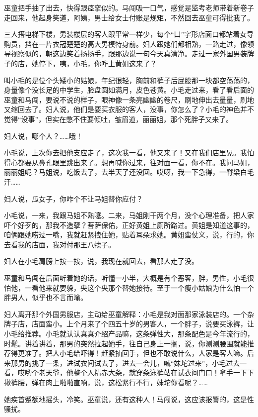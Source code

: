 \documentclass[lang=cn,newtx,12pt,scheme=chinese]{elegantbook}
\begin{document}
巫童把手抽了出去，快得跟痉挛似的。马闯吸一口气，感觉是监考老师带着新卷子走回来，他起身笑道，阿姨，男士给女士付账是规矩，不然回去巫童可得批我了。

三人搭电梯下楼，男装楼层的客人跟平常一样少，每个“凵”字形店面口都站着女导购员，挡在一片衣冠楚楚的高大男模特身前。妇人跟她们都相熟，一路走过，像领导视察似的，朝这边笑着扬扬手，跟那边说一句今天真清净。走过一家外国男装牌子的店，她停下，咦，小毛，你咋上黄姐这来了？

叫小毛的是位个头矮小的姑娘，年纪很轻，胸前和裤子后屁股那一块都空荡荡的，身量像个没长足的中学生，脸盘圆如满月，皮色苍黄。小毛走过来，看了看后面的巫童和马闯，要说不说的样子，眼神像一条亮幽幽的卷尺，刷地伸出去量量，刷地又缩回去了。妇人说，他们是要买衣服的客人，没事，你怎么了？小毛的神色并不觉得“没事”，但实在憋不住要倾吐，皱眉道，丽丽姐，那个死胖子又来了。

妇人说，哪个人？……哦！

小毛说，上次你去把他支应走了，这次我一看，他又来了！又在我们店里晃。我怕得心都要从鼻孔眼里跳出来了。想再喊你过来，往对面一看，你不在。我问马姐，丽丽姐呢？马姐说，吃饭去了，去半天了还没回。哎呀，我一下急得，一脊梁白毛汗……

妇人说，瓜女子，你咋个不让马姐替你应付？

小毛说，一来，我跟马姐不熟噻。二来，马姐刚干两个月，没个心理准备，把人家吓个好歹的，那我不造孽？菩萨保佑，正好黄姐上厕所路过。黄姐是知道这事的，咱俩跟她唠过一嘴，我就赶紧拽住她，贴着耳朵求她。黄姐蛮仗义，说，行的，你去看我的店面，我对付那王八犊子。

妇人在小毛肩膀上按一按，说，我现在就回去，看那人走了没。

巫童和马闯在后面听着她的话，听懂一小半，大概是有个恶客，胖，男性，小毛很怕他，一看他来就要躲，央这个央那个替她接待。至于一个瘦小姑娘为什么怕一个胖男人，似乎也不言而喻。

妇人离开那个外国男服店，主动给巫童解释：小毛是我对面那家泳装店的。一个杂牌子店，店面蛮小。上个月来了个四五十岁的男客人，一个胖子，说要买泳裤，让小毛给推荐。小毛就认认真真介绍产品嘛，这条弹性大，那条配色是今年流行的，时髦。讲着讲着，那男的突然拉起她手，往自己身上一搁，说，你测测腰围就能推荐得更准了。把人小毛给吓得！赶紧抽回手，但也不敢说什么，人家是客人嘛。后来那男的挑了一条，进试衣间试去了，进去一会儿，喊“妹坨过来”，小毛过去一看，哎哟个老天爷，他整个人精赤大条，就穿条泳裤站在试衣间门口！拿手一下下揪裤腰，弹在肉上啪啪直响，说，这松紧行不行，妹坨你看呢？……

她疾首蹙额地摇头，冷笑。巫童说，还有这种人！马闯说，这应该报警的，这是性骚扰。
\end{document}
